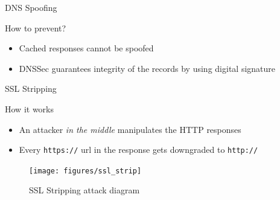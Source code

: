 \documentclass{beamer}
\begin{document}
\begin{frame}{DNS Spoofing}
  \begin{block}{How to prevent?}
  \pause
  \begin{itemize}
    \item Cached responses cannot be spoofed
    \item DNSSec guarantees integrity of the records by using digital signature
  \end{itemize}
  \end{block}
\end{frame}

\begin{frame}{SSL Stripping}
  \begin{block}{How it works}
    \begin{itemize}
      \item An attacker \textit{in the middle} manipulates the HTTP responses
      \item Every \texttt{https://} url in the response gets downgraded to \texttt{http://}
    \end{itemize}
  \end{block}
  \begin{figure}
    \texttt{[image: figures/ssl\_strip]}
    \caption*{SSL Stripping attack diagram}
  \end{figure}
\end{frame}
\end{document}
